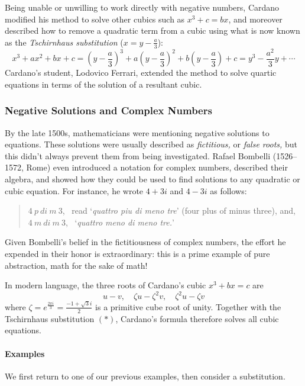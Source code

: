 Being unable or unwilling to work directly with negative numbers, Cardano modified his method to solve other cubics such as $x^3+c=bx$, and moreover described how to remove a quadratic term from a cubic using what is now known as the \emph{Tschirnhaus substitution} ($x=y-\frac a3$):
\[
	x^3+ax^2+bx+c =\left(y-\frac a3\right)^3+a\left(y-\frac a3\right)^2+b\left(y-\frac a3\right)+c =y^3-\frac{a^2}3y+\cdots \tag{$\ast$}
\]
Cardano's student, Lodovico Ferrari, extended the method to solve quartic equations in terms of the solution of a resultant cubic.


\subsubsection*{Negative Solutions and Complex Numbers}

By the late 1500s, mathematicians were mentioning negative solutions to equations. These solutions were usually described as \emph{fictitious,} or \emph{false roots,} but this didn't always prevent them from being investigated. Rafael Bombelli (1526--1572, Rome) even introduced a notation for complex numbers, described their algebra, and showed how they could be used to find solutions to any quadratic or cubic equation. For instance, he wrote $4+3i$ and $4-3i$ as follows:
\begin{quote}
	$4\ p\ di\ m\ 3$, \ read `\emph{quattro piu di meno tre}' (four plus of minus three), and,\\
	$4\ m\ di\ m\ 3$, \ `\emph{quattro meno di meno tre.}'
\end{quote}
Given Bombelli's belief in the fictitiousness of complex numbers, the effort he expended in their honor is extraordinary: this is a prime example of pure abstraction, math for the sake of math!\medbreak

In modern language, the three roots of Cardano's cubic $x^3+bx=c$ are
\[
	u-v,\quad \zeta u-\zeta^2v,\quad \zeta^2u-\zeta v
\]
where $\zeta=e^{\frac{2\pi i}3} =\frac{-1+\sqrt 3i}2$ is a primitive cube root of unity. Together with the Tschirnhaus substitution $(\ast)$, Cardano's formula therefore solves all cubic equations.




\paragraph{Examples}

We first return to one of our previous examples, then consider a substitution.

